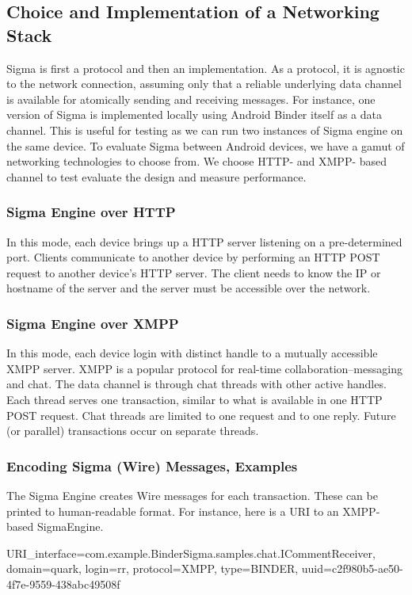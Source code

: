 \documentclass[prodmode]{acmlarge}
\begin{document}
\subsection{Choice and Implementation of a Networking Stack}
Sigma is first a protocol and then an implementation. As a protocol, it is agnostic to the network connection, assuming only that a reliable underlying data channel is available for atomically sending and receiving messages. For instance, one version of Sigma is implemented locally using Android Binder itself as a data channel. This is useful for testing as we can run two instances of Sigma engine on the same device. To evaluate Sigma between Android devices, we have a gamut of networking technologies to choose from. We choose HTTP- and XMPP- based channel to test evaluate the design and measure performance.

\subsubsection{Sigma Engine over HTTP}
In this mode, each device brings up a HTTP server listening on a pre-determined port. Clients communicate to another device by performing an HTTP POST request to another device's HTTP server. The client needs to know the IP or hostname of the server and the server must be accessible over the network.

\subsubsection{Sigma Engine over XMPP}
In this mode, each device login with distinct handle to a mutually accessible XMPP server. XMPP is a popular protocol for real-time collaboration--messaging and chat. The data channel is through chat threads with other active handles. Each thread serves one transaction, similar to what is available in one HTTP POST request. Chat threads are limited to one request and to one reply. Future (or parallel) transactions occur on separate threads.

\subsubsection{Encoding Sigma (Wire) Messages, Examples}
The Sigma Engine creates Wire messages for each transaction. These can be printed to human-readable format. For instance, here is a URI to an XMPP-based SigmaEngine.

\begin{snippet}
URI{_interface=com.example.BinderSigma.samples.chat.ICommentReceiver,
domain=quark, login=rr, protocol=XMPP, type=BINDER,
uuid=c2f980b5-ae50-4f7e-9559-438abc49508f}
\end{snippet}
\end{document}

